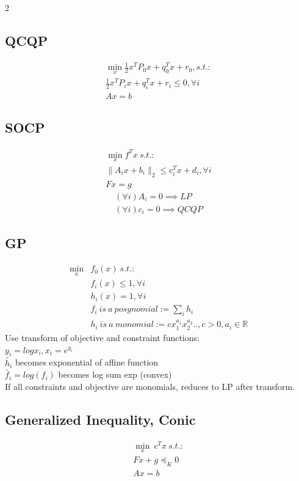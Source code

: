 \documentclass[8pt]{extarticle}
\newcommand{\R}{\mathbb{R}}
\newcommand{\norm}[1]{\|#1\|}
\begin{document}
\begin{multicols*}{2}
  \subsection*{QCQP}
  \begin{align*}
    \min_x \frac{1}{2}x^TP_0x + q_0^Tx + r_0, s.t.:\\
    \frac{1}{2}x^TP_ix + q_i^Tx + r_i \leq 0, \forall i\\
    Ax=b
  \end{align*}
  \subsection*{SOCP}
  \begin{align*}
    \min_x  f^T x\ s.t.:\\
    \norm{A_ix+b_i}_2 \leq c_i^Tx+d_i, \forall i\\
    Fx = g
  \end{align*}
  \begin{align*}
    (\forall i) A_i=0 \implies LP\\
    (\forall i) c_i=0 \implies QCQP
  \end{align*}
  \vfill\null
  \columnbreak
  \subsection*{GP}
  \begin{align*}
    \min_x & f_0(x)\ s.t.:\\
    &f_i(x) \leq 1, \forall i\\
    &h_i(x) = 1, \forall i\\
    &f_i\ is\ a\ posynomial := \sum_i h_i\\
    &h_i\ is\ a\ monomial := cx_1^{a_1}x_2^{a_2}.., c>0, a_i \in \R
  \end{align*}
  Use transform of objective and constraint functions:\\
  $y_i=log x_i, x_i=e^{y_i}$\\
  $\tilde{h_i}$ becomes exponential of affine function\\
  $\tilde{f_i} = log(f_i)$ becomes log sum exp (convex)\\
  If all constraints and objective are monomials, reduces to LP after transform.

  \subsection*{Generalized Inequality, Conic}
    \begin{align*}
    \min_x\ c^Tx\ s.t.:\\
    F x + g \preceq_K 0\\
    Ax=b
    \end{align*}
    

\end{multicols*}
\end{document}
